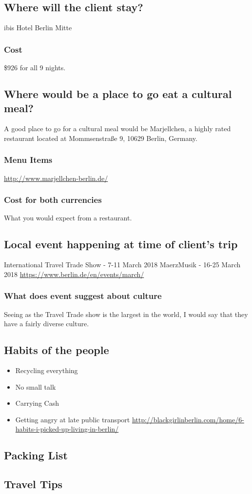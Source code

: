 \documentclass[11pt]{article}
\begin{document}
\subsection*{Where will the client stay?}
\label{sec:org530c19f}
ibis Hotel Berlin Mitte \cite{booking}
\subsubsection*{Cost}
\label{sec:org6967b80}
\$926 for all 9 nights.
\subsection*{Where would be a place to go eat a cultural meal?}
\label{sec:org812fdfb}
A good place to go for a cultural meal would be Marjellchen, a highly rated restaurant located at Mommsenstraße 9, 10629 Berlin, Germany. 
\subsubsection*{Menu Items}
\label{sec:orgc20872e}
\url{http://www.marjellchen-berlin.de/}
\subsubsection*{Cost for both currencies}
\label{sec:org920543c}
What you would expect from a restaurant.
\subsection*{Local event happening at time of client's trip}
\label{sec:org695969f}
International Travel Trade Show - 7-11 March 2018
MaerzMusik - 16-25 March 2018
\url{https://www.berlin.de/en/events/march/}
\subsubsection*{What does event suggest about culture}
\label{sec:org923646c}
Seeing as the Travel Trade show is the largest in the world, I would say that they have a fairly diverse culture.
\subsection*{Habits of the people}
\label{sec:orgbf08fa9}
\begin{itemize}
\item Recycling everything
\item No small talk
\item Carrying Cash
\item Getting angry at late public transport
\url{http://blackgirlinberlin.com/home/6-habits-i-picked-up-living-in-berlin/}
\end{itemize}
\subsection*{Packing List}
\label{sec:org6410469}
\subsection*{Travel Tips}
\label{sec:orgaf89d55}

{}

\end{document}
